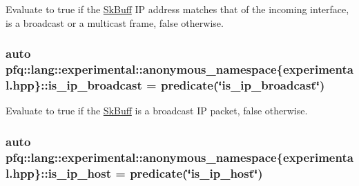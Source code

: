 Evaluate to {\ttfamily true} if the \hyperlink{structpfq_1_1lang_1_1SkBuff}{Sk\+Buff} IP address matches that of the incoming interface, is a broadcast or a multicast frame, {\ttfamily false} otherwise. 

\subsubsection[{\texorpdfstring{is\+\_\+ip\+\_\+broadcast}{is_ip_broadcast}}]{\setlength{\rightskip}{0pt plus 5cm}auto pfq\+::lang\+::experimental\+::anonymous\+\_\+namespace\{experimental.\+hpp\}\+::is\+\_\+ip\+\_\+broadcast = {\bf predicate}(\char`\"{}is\+\_\+ip\+\_\+broadcast\char`\"{})}\hypertarget{namespacepfq_1_1lang_1_1experimental_1_1anonymous__namespace_02experimental_8hpp_03_a2d9128841747bf619fdf6ea411ee35e4}{}\label{namespacepfq_1_1lang_1_1experimental_1_1anonymous__namespace_02experimental_8hpp_03_a2d9128841747bf619fdf6ea411ee35e4}


Evaluate to {\ttfamily true} if the \hyperlink{structpfq_1_1lang_1_1SkBuff}{Sk\+Buff} is a broadcast IP packet, {\ttfamily false} otherwise. 

\subsubsection[{\texorpdfstring{is\+\_\+ip\+\_\+host}{is_ip_host}}]{\setlength{\rightskip}{0pt plus 5cm}auto pfq\+::lang\+::experimental\+::anonymous\+\_\+namespace\{experimental.\+hpp\}\+::is\+\_\+ip\+\_\+host = {\bf predicate}(\char`\"{}is\+\_\+ip\+\_\+host\char`\"{})}\hypertarget{namespacepfq_1_1lang_1_1experimental_1_1anonymous__namespace_02experimental_8hpp_03_a323f07b8b6098198779c19fdf4c95837}{}\label{namespacepfq_1_1lang_1_1experimental_1_1anonymous__namespace_02experimental_8hpp_03_a323f07b8b6098198779c19fdf4c95837}


